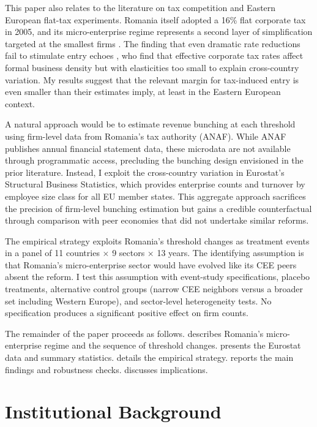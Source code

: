 \documentclass[12pt]{article}
\begin{document}
This paper also relates to the literature on tax competition and Eastern European flat-tax experiments. Romania itself adopted a 16\% flat corporate tax in 2005, and its micro-enterprise regime represents a second layer of simplification targeted at the smallest firms \citep{keen2008flat}. The finding that even dramatic rate reductions fail to stimulate entry echoes \citet{djankov2010effect}, who find that effective corporate tax rates affect formal business density but with elasticities too small to explain cross-country variation. My results suggest that the relevant margin for tax-induced entry is even smaller than their estimates imply, at least in the Eastern European context.

A natural approach would be to estimate revenue bunching at each threshold using firm-level data from Romania's tax authority (ANAF). While ANAF publishes annual financial statement data, these microdata are not available through programmatic access, precluding the bunching design envisioned in the prior literature. Instead, I exploit the cross-country variation in Eurostat's Structural Business Statistics, which provides enterprise counts and turnover by employee size class for all EU member states. This aggregate approach sacrifices the precision of firm-level bunching estimation but gains a credible counterfactual through comparison with peer economies that did not undertake similar reforms.

The empirical strategy exploits Romania's threshold changes as treatment events in a panel of 11 countries $\times$ 9 sectors $\times$ 13 years. The identifying assumption is that Romania's micro-enterprise sector would have evolved like its CEE peers absent the reform. I test this assumption with event-study specifications, placebo treatments, alternative control groups (narrow CEE neighbors versus a broader set including Western Europe), and sector-level heterogeneity tests. No specification produces a significant positive effect on firm counts.

The remainder of the paper proceeds as follows.  describes Romania's micro-enterprise regime and the sequence of threshold changes.  presents the Eurostat data and summary statistics.  details the empirical strategy.  reports the main findings and robustness checks.  discusses implications.


\section{Institutional Background}
\label{sec:background}
\end{document}
